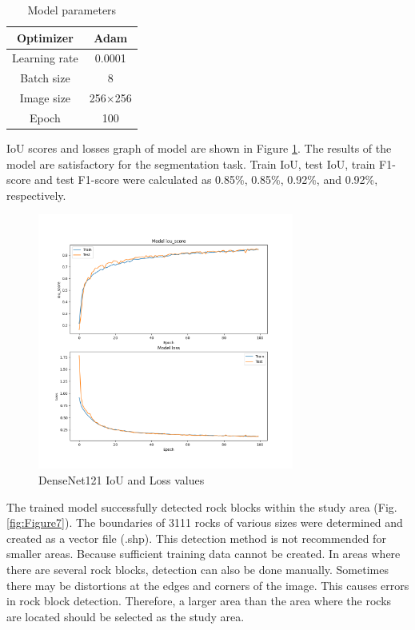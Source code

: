 \documentclass[a4paper,fleqn]{cas-sc}
\begin{document}
\begin{table}
	\centering
	\caption{Model parameters}
	\label{tab:Table1}
	\begin{tabular}{ |c|c|} 
		\hline
		Optimizer&Adam\\ 
		\hline 
		Learning rate&0.0001\\
		\hline
		Batch size&8\\
		\hline
		Image size&256$\times$256\\
		\hline
		Epoch&100\\
		\hline
	\end{tabular} 
\end{table}


IoU scores and losses graph of model are shown in Figure \ref{fig:Figure6}. The results of the model are satisfactory for the segmentation task. Train IoU, test IoU, train F1-score and test F1-score were calculated as 0.85\%, 0.85\%, 0.92\%, and 0.92\%, respectively.

\begin{figure}
	\centering
	\includegraphics[width=0.75\textwidth]{figures/fig6.png}
	\caption{DenseNet121 IoU and Loss values}
	\label{fig:Figure6}
\end{figure}

The trained model successfully detected rock blocks within the study area (Fig. \ref{fig:Figure7}). The boundaries of 3111 rocks of various sizes were determined and created as a vector file (.shp). This detection method is not recommended for smaller areas. Because sufficient training data cannot be created. In areas where there are several rock blocks, detection can also be done manually. 
Sometimes there may be distortions at the edges and corners of the image. This causes errors in rock block detection. Therefore, a larger area than the area where the rocks are located should be selected as the study area.
\end{document}
